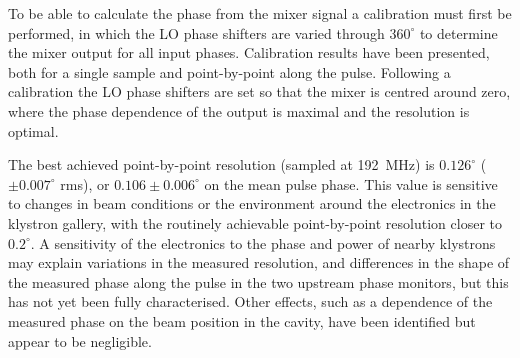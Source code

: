 To be able to calculate the phase from the mixer signal a calibration must first be performed, in which the LO phase shifters are varied through \(360^\circ\) to determine the mixer output for all input phases. Calibration results have been presented, both for a single sample and point-by-point along the pulse. Following a calibration the LO phase shifters are set so that the mixer is centred around zero, where the phase dependence of the output is maximal and the resolution is optimal.

The best achieved point-by-point resolution (sampled at 192~MHz) is \(0.126^\circ\) (\(\pm 0.007^\circ\) rms), or \(0.106\pm0.006^\circ\) on the mean pulse phase. This value is sensitive to changes in beam conditions or the environment around the electronics in the klystron gallery, with the routinely achievable point-by-point resolution closer to \(0.2^\circ\). A sensitivity of the electronics to the phase and power of nearby klystrons may explain variations in the measured resolution, and differences in the shape of the measured phase along the pulse in the two upstream phase monitors, but this has not yet been fully characterised. Other effects, such as a dependence of the measured phase on the beam position in the cavity, have been identified but appear to be negligible.

